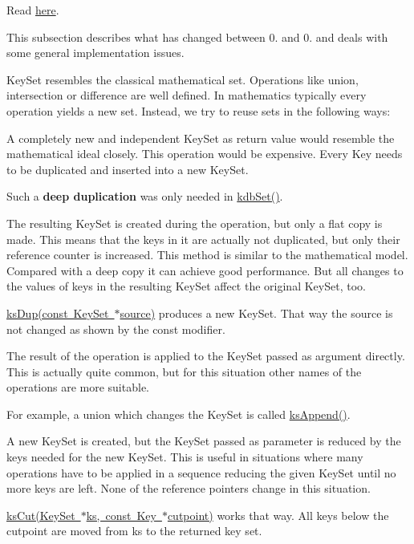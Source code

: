 Read \mbox{\hyperlink{doc_dev_metadata_md}{here}}.

This subsection describes what has changed between 0. and 0. and deals with some general implementation issues.

{\ttfamily Key\+Set} resembles the classical mathematical set. Operations like union, intersection or difference are well defined. In mathematics typically every operation yields a new set. Instead, we try to reuse sets in the following ways\+:


\begin{DoxyItemize}
\item A completely new and independent {\ttfamily Key\+Set} as return value would resemble the mathematical ideal closely. This operation would be expensive. Every {\ttfamily Key} needs to be duplicated and inserted into a new {\ttfamily Key\+Set}.

Such a {\bfseries{deep duplication}} was only needed in {\ttfamily \mbox{\hyperlink{group__kdb_ga11436b058408f83d303ca5e996832bcf}{kdb\+Set()}}}.
\item The resulting {\ttfamily Key\+Set} is created during the operation, but only a flat copy is made. This means that the keys in it are actually not duplicated, but only their reference counter is increased. This method is similar to the mathematical model. Compared with a deep copy it can achieve good performance. But all changes to the values of keys in the resulting {\ttfamily Key\+Set} affect the original {\ttfamily Key\+Set}, too.

{\ttfamily \mbox{\hyperlink{group__keyset_gac59e4b328245463f1451f68d5106151c}{ks\+Dup(const Key\+Set $\ast$source)}}} produces a new {\ttfamily Key\+Set}. That way the {\ttfamily source} is not changed as shown by the {\ttfamily const} modifier.
\item The result of the operation is applied to the {\ttfamily Key\+Set} passed as argument directly. This is actually quite common, but for this situation other names of the operations are more suitable.

For example, a union which changes the {\ttfamily Key\+Set} is called {\ttfamily \mbox{\hyperlink{group__keyset_ga21eb9c3a14a604ee3a8bdc779232e7b7}{ks\+Append()}}}.
\item A new {\ttfamily Key\+Set} is created, but the {\ttfamily Key\+Set} passed as parameter is reduced by the keys needed for the new {\ttfamily Key\+Set}. This is useful in situations where many operations have to be applied in a sequence reducing the given {\ttfamily Key\+Set} until no more keys are left. None of the reference pointers change in this situation.

{\ttfamily \mbox{\hyperlink{group__keyset_ga6b00cf82b59af4d883a9bad6cf4a4a4a}{ks\+Cut(\+Key\+Set $\ast$ks, const Key $\ast$cutpoint)}}} works that way. All keys below the {\ttfamily cutpoint} are moved from {\ttfamily ks} to the returned key set.
\end{DoxyItemize}

